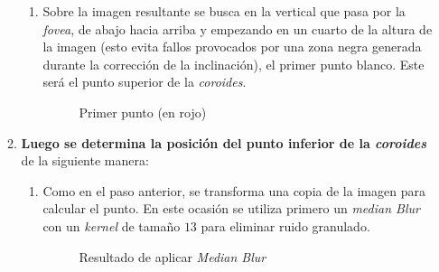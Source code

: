 \begin{enumerate}
\begin{enumerate}[label*=\arabic*.]
\begin{enumerate}[label*=\arabic*.]
    \item Sobre la imagen resultante se busca en la vertical que pasa
      por la \emph{\gls{fovea}}, de abajo hacia arriba y empezando en
      un cuarto de la altura de la imagen (esto evita fallos
      provocados por una zona negra generada durante la corrección de
      la inclinación), el primer punto blanco. Este será el punto
      superior de la \emph{\gls{coroides}}.

      \begin{figure}[H]
        \caption{Primer punto (en rojo)}
        \centering \setlength\fboxsep{0pt} \setlength\fboxrule{0.5pt}
      \end{figure}

    \end{enumerate}
  \item \textbf{Luego se determina la posición del punto inferior de
      la \emph{\gls{coroides}}} de la siguiente manera:
    \begin{enumerate}[label*=\arabic*.]
    \item Como en el paso anterior, se transforma una copia de la
      imagen para calcular el punto. En este ocasión se utiliza
      primero un \emph{median Blur} con un \emph{kernel} de tamaño
      $13$ para eliminar ruido granulado.

      \begin{figure}[H]
        \caption{Resultado de aplicar \emph{Median Blur}}
        \centering \setlength\fboxsep{0pt} \setlength\fboxrule{0.5pt}
      \end{figure}


\end{enumerate}
\end{enumerate}
\end{enumerate}
